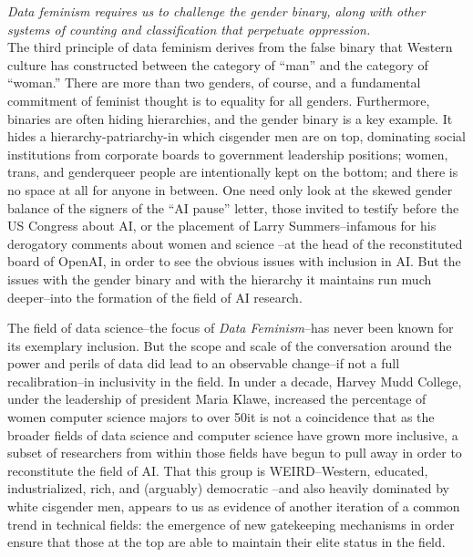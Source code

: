 \textit{Data feminism requires us to challenge the gender binary, along with other systems of counting and classification that perpetuate oppression. }
\\[5pt]
The third principle of data feminism derives from the false binary that Western culture has constructed between the category of “man” and the category of “woman.” There are more than two genders, of course, and a fundamental commitment of feminist thought is to equality for all genders. Furthermore, binaries are often hiding hierarchies, and the gender binary is a key example. It hides a hierarchy-patriarchy-in which cisgender men are on top, dominating social institutions from corporate boards to government leadership positions; women, trans, and genderqueer people are intentionally kept on the bottom; and there is no space at all for anyone in between. One need only look at the skewed gender balance of the signers of the “AI pause” letter, those invited to testify before the US Congress about AI, or the placement of Larry Summers–infamous for his derogatory comments about women and science \cite{Summers}–at the head of the reconstituted board of OpenAI, in order to see the obvious issues with inclusion in AI. But the issues with the gender binary and with the hierarchy it maintains run much deeper–into the formation of the field of AI research.


The field of data science–the focus of \textit{Data Feminism}–has never been known for its exemplary inclusion. But the scope and scale of the conversation around the power and perils of data did lead to an observable change–if not a full recalibration–in inclusivity in the field. 
In under a decade, Harvey Mudd College, under the leadership of president Maria Klawe, increased the percentage of women computer science majors to over 50\But it is not a coincidence that as the broader fields of data science and computer science have grown more inclusive, a subset of researchers from within those fields have begun to pull away in order to reconstitute the field of AI. That this group is WEIRD–Western, educated, industrialized, rich, and (arguably) democratic \cite{Septiandri_Constantinides_Tahaei_Quercia_2023}–and also heavily dominated by white cisgender men, appears to us as evidence of another iteration of a common trend in technical fields: the emergence of new gatekeeping mechanisms in order ensure that those at the top are able to maintain their elite status in the field. 

